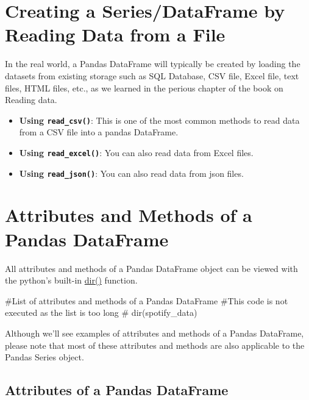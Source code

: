 \documentclass[
  letterpaper,
  DIV=11,
  numbers=noendperiod]{scrreprt}
\newenvironment{Shaded}{\begin{snugshade}}{\end{snugshade}}
\newcommand{\CommentTok}[1]{\textcolor[rgb]{0.37,0.37,0.37}{#1}}
\providecommand{\tightlist}{%
  \setlength{\itemsep}{0pt}\setlength{\parskip}{0pt}}\usepackage{longtable,booktabs,array}
\begin{document}
\hypertarget{creating-a-seriesdataframe-by-reading-data-from-a-file}{%
\section{Creating a Series/DataFrame by Reading Data from a
File}\label{creating-a-seriesdataframe-by-reading-data-from-a-file}}

In the real world, a Pandas DataFrame will typically be created by
loading the datasets from existing storage such as SQL Database, CSV
file, Excel file, text files, HTML files, etc., as we learned in the
perious chapter of the book on Reading data.

\begin{itemize}
\tightlist
\item
  \textbf{Using \texttt{read\_csv()}}: This is one of the most common
  methods to read data from a CSV file into a pandas DataFrame.
\item
  \textbf{Using \texttt{read\_excel()}}: You can also read data from
  Excel files.
\item
  \textbf{Using \texttt{read\_json()}}: You can also read data from json
  files.
\end{itemize}

\hypertarget{attributes-and-methods-of-a-pandas-dataframe}{%
\section{Attributes and Methods of a Pandas
DataFrame}\label{attributes-and-methods-of-a-pandas-dataframe}}

All attributes and methods of a Pandas DataFrame object can be viewed
with the python's built-in
\href{https://docs.python.org/3/library/functions.html\#dir}{dir()}
function.

\begin{Shaded}
\begin{Highlighting}[]
\CommentTok{\#List of attributes and methods of a Pandas DataFrame}
\CommentTok{\#This code is not executed as the list is too long}
\CommentTok{\# dir(spotify\_data)}
\end{Highlighting}
\end{Shaded}

Although we'll see examples of attributes and methods of a Pandas
DataFrame, please note that most of these attributes and methods are
also applicable to the Pandas Series object.

\hypertarget{attributes-of-a-pandas-dataframe}{%
\subsection{Attributes of a Pandas
DataFrame}\label{attributes-of-a-pandas-dataframe}}
\end{document}
